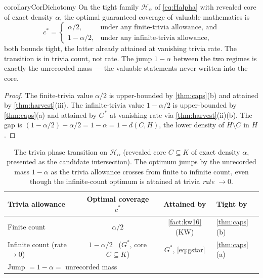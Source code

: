 \documentclass[11pt]{article}
\numberwithin{equation}{section}
\newcommand{\mc}[1]{\mathcal{#1}}
\newcommand{\Val}{H}
\newcommand{\Hcal}{\mc{H}}
\newcommand{\Hfam}{\Hcal_{\alpha}}
\newcommand{\Core}{C}
\newcommand{\dens}[2]{d(#1,#2)}
\newcommand{\cov}{c}
\theoremstyle{plain}
\theoremstyle{definition}
\theoremstyle{remark}
\begin{document}
\begin{restatable}{corollary}{CorDichotomy}\label{cor:dichotomy}
On the tight family $\Hfam$ of \eqref{eq:Halpha} with revealed core of exact density $\alpha$,
the optimal guaranteed coverage of valuable mathematics is
\begin{equation}\label{eq:dichotomy}
  \cov^* =
  \begin{cases}
    \alpha/2, & \text{under any finite-trivia allowance, and}\\
    1 - \alpha/2, & \text{under any infinite-trivia allowance,}
  \end{cases}
\end{equation}
both bounds tight, the latter already attained at vanishing trivia rate. The transition is in
trivia count, not rate. The jump $1 - \alpha$ between the two regimes is exactly the
unrecorded mass --- the valuable statements never written into the core.
\end{restatable}

\begin{proof}
The finite-trivia value $\alpha/2$ is upper-bounded by \cref{thm:caps}(b) and attained by
\cref{thm:harvest}(iii). The infinite-trivia value $1 - \alpha/2$ is upper-bounded by
\cref{thm:caps}(a) and attained by $G^*$ at vanishing rate via \cref{thm:harvest}(ii)(b). The
gap is $(1 - \alpha/2) - \alpha/2 = 1 - \alpha = 1 - \dens{\Core}{\Val}$, the lower density of
$\Val \setminus \Core$ in $\Val$.
\end{proof}

\begin{table}[t]
\centering
\caption{The trivia phase transition on $\Hfam$ (revealed core $\Core \subseteq K$ of
exact density $\alpha$, presented as the candidate intersection). The optimum jumps by the
unrecorded mass $1-\alpha$ as the trivia allowance crosses from finite to infinite count,
even though the infinite-count optimum is attained at trivia \emph{rate} $\to 0$.}
\label{tab:dichotomy}
\begin{tabular}{@{}lccl@{}}
\toprule
Trivia allowance & Optimal coverage $\cov^*$ & Attained by & Tight by \\
\midrule
Finite count & $\alpha/2$ & \cref{fact:kw16} (KW) & \cref{thm:caps}(b) \\
Infinite count (rate $\to 0$) & $1 - \alpha/2$ \ {\footnotesize($G^*$, core $\Core \subseteq K$)} & $G^*$, \cref{eq:gstar} & \cref{thm:caps}(a) \\
\midrule
\multicolumn{2}{l}{Jump $= 1 - \alpha = $ unrecorded mass} & & \\
\bottomrule
\end{tabular}
\end{table}
\end{document}
